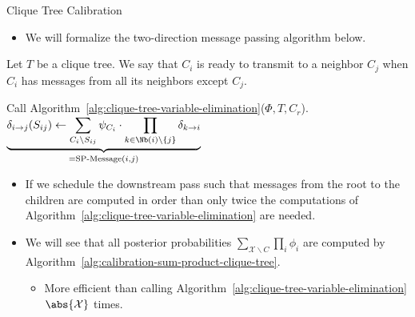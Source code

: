 \begin{frame}{Clique Tree Calibration}
\begin{itemize}
\item We will formalize the two-direction message passing algorithm below.
\end{itemize}
\pause
\begin{definition}
    Let $T$ be a clique tree. We say that $C_i$ is ready to transmit to a neighbor $C_j$ when $C_i$ has messages from all its neighbors except $C_j$.
\end{definition}
\pause
\begin{algorithm}[H]
   \caption{Calibration Sum-Produce Message Passing in Clique Tree}
   \label{alg:calibration-sum-product-clique-tree}
    Call Algorithm~\ref{alg:clique-tree-variable-elimination}($\Phi, T, C_r$).\;
    {
        $\underbrace{\delta_{i \rightarrow j}(S_{ij}) \leftarrow \sum_{C_i \setminus S_{ij}} \psi_{C_i} \cdot \prod_{k \in \Nb(i) \backslash \{j\}} \delta_{k \rightarrow i}}_{= \text{SP-Message}(i,j)}$\;
    }
\end{algorithm}
\begin{itemize}
    \pause \item If we schedule the downstream pass such that messages from the root to the children are computed in order than only twice the computations of Algorithm~\ref{alg:clique-tree-variable-elimination} are needed.
    \pause \item We will see that all posterior probabilities $\sum_{\mathcal{X} \backslash C} \prod_i \phi_i$ are computed by Algorithm~\ref{alg:calibration-sum-product-clique-tree}.
    \begin{itemize}
        \pause \item More efficient than calling Algorithm~\ref{alg:clique-tree-variable-elimination} $\abs{\mathcal{X}}$ times.
    \end{itemize}
\end{itemize}
\end{frame}

